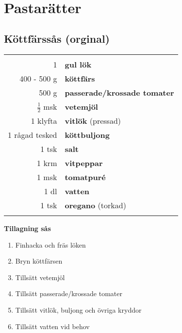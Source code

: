 
\section{Pastarätter}

\clearpage

\subsection{Köttfärssås (orginal)}

\begin{table}[H]
	\begin{tabular}{rl}
	\hline
	&\\
		1 & \textbf{gul lök} \\
		400 - 500 g & \textbf{köttfärs}\\
		500 g & \textbf{passerade/krossade tomater}\\
		$\frac{1}{2}$ msk & \textbf{vetemjöl}\\
		1 klyfta & \textbf{vitlök} (pressad)\\
		1 rågad tesked & \textbf{köttbuljong}\\
		1 tsk & \textbf{salt}\\
		1 krm & \textbf{vitpeppar}\\
		1 msk & \textbf{tomatpuré}\\
		1 dl & \textbf{vatten}\\
		1 tsk & \textbf{oregano} (torkad) \\
	&\\
	\hline
	\end{tabular}
\end{table}


\begin{multicols*}{2}

\noindent \textbf{Tillagning sås}
\begin{enumerate}
	\itemsep0cm
	\item Finhacka och fräs löken
	\item Bryn köttfärsen
	\item Tillsätt vetemjöl
	\item Tillsätt passerade/krossade tomater
	\item Tillsätt vitlök, buljong och övriga kryddor
	\item Tillsätt vatten vid behov
\end{enumerate}

\end{multicols*}

